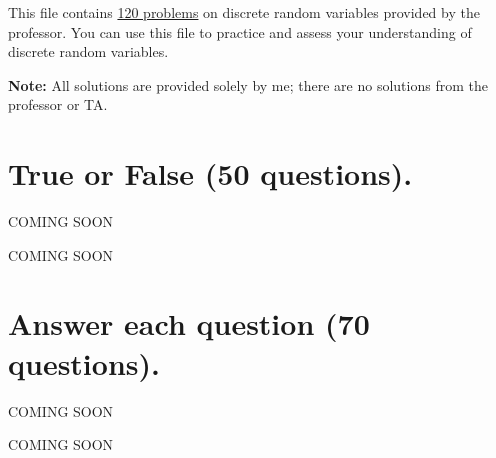 \documentclass[a4paper, 10pt]{article}
\begin{document}
\subject[2110205 - Statistics for Computer Engineering]

\noindent This file contains \underline{120 problems} on discrete random variables provided by the professor.
You can use this file to practice and assess your understanding of discrete random variables.

\vspace{2mm}

\noindent \textbf{Note:} All solutions are provided solely by me; there are no solutions from the professor or TA.

\section{True or False (50 questions).}



\begin{problem}
COMING SOON
\end{problem}

\begin{solution}
COMING SOON
\end{solution}




\section{Answer each question (70 questions).}



\begin{problem}[51]
COMING SOON
\end{problem}

\begin{solution}
COMING SOON
\end{solution}
\end{document}
